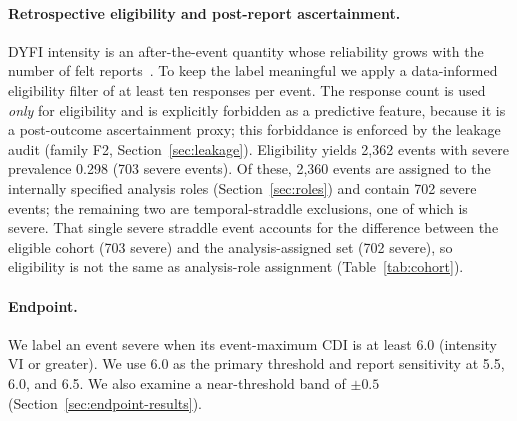 \documentclass[pdflatex,sn-basic,Numbered]{sn-jnl}
\begin{document}
\paragraph{Retrospective eligibility and post-report ascertainment.} DYFI
intensity is an after-the-event quantity whose reliability grows with the number
of felt reports~\citep{quitoriano2020dyfi}. To keep the label meaningful we apply
a data-informed eligibility filter of at least ten responses per event. The
response count is used \emph{only} for eligibility and is explicitly forbidden as
a predictive feature, because it is a post-outcome ascertainment proxy; this
forbiddance is enforced by the leakage audit (family F2,
Section~\ref{sec:leakage}). Eligibility yields 2{,}362 events with severe
prevalence 0.298 (703 severe events). Of these, 2{,}360 events are assigned to
the internally specified analysis roles (Section~\ref{sec:roles}) and contain 702 severe
events; the remaining two are temporal-straddle exclusions, one of which is
severe. That single severe straddle event accounts for the difference between the
eligible cohort (703 severe) and the analysis-assigned set (702 severe), so
eligibility is not the same as analysis-role assignment (Table~\ref{tab:cohort}).

\paragraph{Endpoint.} We label an event severe when its event-maximum CDI is at
least 6.0 (intensity VI or greater). We use 6.0 as the primary threshold and
report sensitivity at 5.5, 6.0, and 6.5. We also examine a near-threshold band
of $\pm0.5$ (Section~\ref{sec:endpoint-results}).
\end{document}

